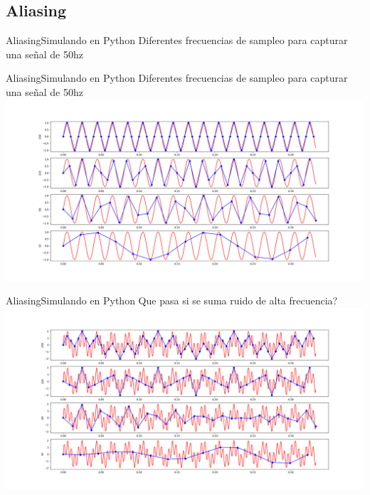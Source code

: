 \begin{darkframes}
       \subsection{Aliasing}
      \begin{frame}{Aliasing}{Simulando en Python}
         \handsonicon
         Diferentes frecuencias de sampleo para capturar una señal de 50hz
         
         \vfill
      \end{frame}
      \begin{frame}{Aliasing}{Simulando en Python}
         Diferentes frecuencias de sampleo para capturar una señal de 50hz
         \center\includegraphics[width=1.0\textwidth]{1_clase/teorema_sampleo}
         \vfill
      \end{frame}
      \begin{frame}{Aliasing}{Simulando en Python}
         Que pasa si se suma ruido de alta frecuencia?
         \center\includegraphics[width=1.0\textwidth]{1_clase/teorema_sampleo2}
         \vfill
      \end{frame}

\end{darkframes}
